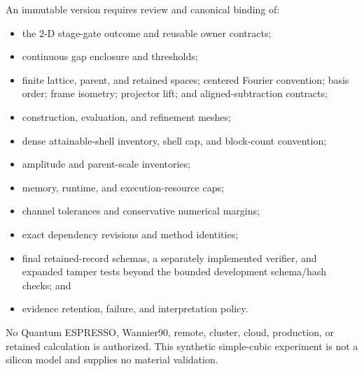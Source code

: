 \documentclass[11pt]{article}
\begin{document}
An immutable version requires review and canonical binding of:

\begin{itemize}
 \item the 2-D stage-gate outcome and reusable owner contracts;
 \item continuous gap enclosure and thresholds;
 \item finite lattice, parent, and retained spaces; centered Fourier convention; basis
       order; frame isometry; projector lift; and aligned-subtraction contracts;
 \item construction, evaluation, and refinement meshes;
 \item dense attainable-shell inventory, shell cap, and block-count convention;
 \item amplitude and parent-scale inventories;
 \item memory, runtime, and execution-resource caps;
 \item channel tolerances and conservative numerical margins;
 \item exact dependency revisions and method identities;
 \item final retained-record schemas, a separately implemented verifier, and expanded
       tamper tests beyond the bounded development schema/hash checks; and
 \item evidence retention, failure, and interpretation policy.
\end{itemize}

No Quantum ESPRESSO, Wannier90, remote, cluster, cloud, production, or retained
calculation is authorized. This synthetic simple-cubic experiment is not a silicon
model and supplies no material validation.



\end{document}
